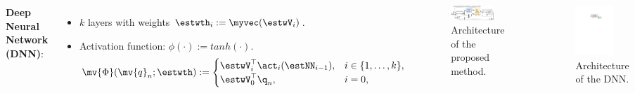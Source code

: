 \documentclass[8pt, aspectratio=169, handout]{beamer}
\begin{document}
\begin{frame}{\insertsubsectionhead}
\begin{columns}
    {
      \textbf{Deep Neural Network (DNN)}:
      \small{
        \begin{itemize}
          \item $k$ layers with weights $\estwth_i:=\myvec(\estwV_i)$.
          \item Activation function: $\phi(\cdot):=tanh(\cdot)$.
          \begin{equation}\label{eq:NN}
            \mv{\Phi}(\mv{q}_n; \estwth)
            :=
            \begin{cases}
                \estwV_i^\top \act_i(\estNN_{i-1}), 
                &
                i\in\{1,\dots ,k\},
                \\
                \estwV_0^\top {\q}_n,
                &
                i=0
                ,
            \end{cases}
          \end{equation}
        \end{itemize}
      }
    }


      \begin{figure}
        \includegraphics[width=0.8\textwidth]{figures/Controller.drawio.pdf}
        \caption{Architecture of the proposed method.}
      \end{figure}

    {
      \begin{figure}
        \includegraphics[width=0.7\textwidth]{figures/DNN.drawio.pdf}
        \caption{Architecture of the DNN.}
      \end{figure}
    }


\end{columns}
\end{frame}
\end{document}
